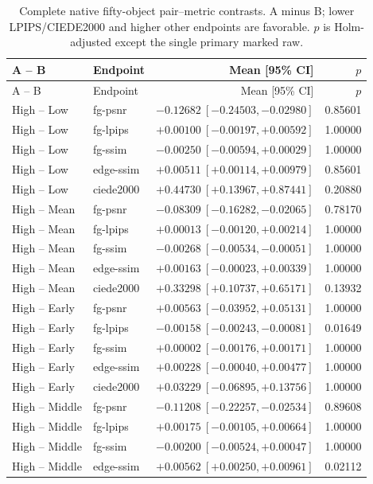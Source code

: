 \documentclass[11pt]{article}
\begin{document}
\begingroup\scriptsize
\begin{longtable}{llrr}
\caption{Complete native fifty-object pair--metric contrasts. A minus B; lower LPIPS/CIEDE2000 and higher other endpoints are favorable. $p$ is Holm-adjusted except the single primary marked raw.}\label{tab:mva50-paired}\\
\toprule A -- B & Endpoint & Mean [95\% CI] & $p$ \\
\midrule\endfirsthead
\toprule A -- B & Endpoint & Mean [95\% CI] & $p$ \\
\midrule\endhead
High -- Low & fg-psnr & $-0.12682\ [-0.24503,-0.02980]$ & 0.85601 \\
High -- Low & fg-lpips & $+0.00100\ [-0.00197,+0.00592]$ & 1.00000 \\
High -- Low & fg-ssim & $-0.00250\ [-0.00594,+0.00029]$ & 1.00000 \\
High -- Low & edge-ssim & $+0.00511\ [+0.00114,+0.00979]$ & 0.85601 \\
High -- Low & ciede2000 & $+0.44730\ [+0.13967,+0.87441]$ & 0.20880 \\
High -- Mean & fg-psnr & $-0.08309\ [-0.16282,-0.02065]$ & 0.78170 \\
High -- Mean & fg-lpips & $+0.00013\ [-0.00120,+0.00214]$ & 1.00000 \\
High -- Mean & fg-ssim & $-0.00268\ [-0.00534,-0.00051]$ & 1.00000 \\
High -- Mean & edge-ssim & $+0.00163\ [-0.00023,+0.00339]$ & 1.00000 \\
High -- Mean & ciede2000 & $+0.33298\ [+0.10737,+0.65171]$ & 0.13932 \\
High -- Early & fg-psnr & $+0.00563\ [-0.03952,+0.05131]$ & 1.00000 \\
High -- Early & fg-lpips & $-0.00158\ [-0.00243,-0.00081]$ & 0.01649 \\
High -- Early & fg-ssim & $+0.00002\ [-0.00176,+0.00171]$ & 1.00000 \\
High -- Early & edge-ssim & $+0.00228\ [-0.00040,+0.00477]$ & 1.00000 \\
High -- Early & ciede2000 & $+0.03229\ [-0.06895,+0.13756]$ & 1.00000 \\
High -- Middle & fg-psnr & $-0.11208\ [-0.22257,-0.02534]$ & 0.89608 \\
High -- Middle & fg-lpips & $+0.00175\ [-0.00105,+0.00664]$ & 1.00000 \\
High -- Middle & fg-ssim & $-0.00200\ [-0.00524,+0.00047]$ & 1.00000 \\
High -- Middle & edge-ssim & $+0.00562\ [+0.00250,+0.00961]$ & 0.02112 \\

\end{longtable}
\end{document}

